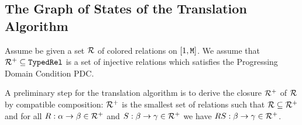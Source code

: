 \documentclass{lmcs}
\begin{document}
%
%
%
%
%
%
%
%
%
%
%


\subsection{The Graph of States of the Translation Algorithm}
Assume be given a set ${\mathcal R}$ of colored relations on $[1,{\tt M}]$. We assume
that ${\mathcal R}^+ \subseteq {\tt TypedRel}$ is a set of injective relations which satisfies the Progressing 
Domain Condition PDC. 

A preliminary step for the translation algorithm is to derive the closure ${\mathcal R}^+$ of ${\mathcal R}$ 
by compatible composition: ${\mathcal R}^+$ is the smallest set of relations such that 
${\mathcal R} \subseteq {\mathcal R}^+$ and for all $R:\alpha \rightarrow \beta \in {\mathcal R}^+$ and 
$S : \beta \rightarrow \gamma \in {\mathcal R}^+$ we have 
$RS:\beta \rightarrow \gamma \in {\mathcal R}^+$.
\end{document}

